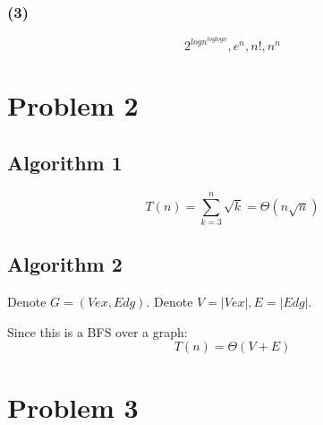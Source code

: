 \documentclass{article}
\begin{document}
		\subsubsection*{(3)}
			$$ 2^{log n^{log log n}} , e^n , n! , n^n$$



\section*{Problem 2}
	\subsection*{Algorithm 1}
		$$ T(n) = \sum_{k = 3}^n{\sqrt{k}} = \Theta(n\sqrt{n})$$
	\subsection*{Algorithm 2}
		Denote $ G = (Vex, Edg) $.
		Denote $ V = |Vex|, E = |Edg|$.
		\par Since this is a BFS over a graph:
		$$ T(n) = \Theta(V+E) $$

\section*{Problem 3}
\end{document}
